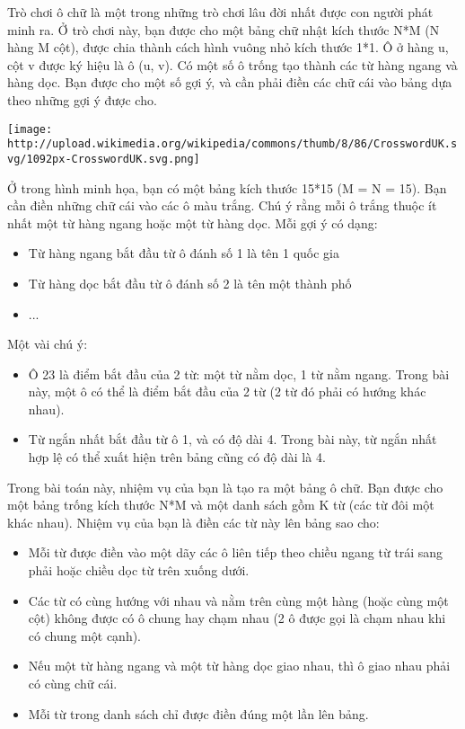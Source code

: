 

Trò chơi ô chữ là một trong những trò chơi lâu đời nhất được con người phát minh ra. Ở trò chơi này, bạn được cho một bảng chữ nhật kích thước N*M (N hàng M cột), được chia thành cách hình vuông nhỏ kích thước 1*1. Ô ở hàng u, cột v được ký hiệu là ô (u, v). Có một số ô trống tạo thành các từ hàng ngang và hàng dọc. Bạn được cho một số gợi ý, và cần phải điền các chữ cái vào bảng dựa theo những gợi ý được cho.


\texttt{[image: http://upload.wikimedia.org/wikipedia/commons/thumb/8/86/CrosswordUK.svg/1092px-CrosswordUK.svg.png]}

Ở trong hình minh họa, bạn có một bảng kích thước 15*15 (M = N = 15). Bạn cần điền những chữ cái vào các ô màu trắng. Chú ý rằng mỗi ô trắng thuộc ít nhất một từ hàng ngang hoặc một từ hàng dọc. Mỗi gợi ý có dạng:
\begin{itemize}
	\item Từ hàng ngang bắt đầu từ ô đánh số 1 là tên 1 quốc gia
	\item Từ hàng dọc bắt đầu từ ô đánh số 2 là tên một thành phố
	\item ...
\end{itemize}

Một vài chú ý:
\begin{itemize}
	\item Ô 23 là điểm bắt đầu của 2 từ: một từ nằm dọc, 1 từ nằm ngang. Trong bài này, một ô có thể là điểm bắt đầu của 2 từ (2 từ đó phải có hướng khác nhau).
	\item Từ ngắn nhất bắt đầu từ ô 1, và có độ dài 4. Trong bài này, từ ngắn nhất hợp lệ có thể xuất hiện trên bảng cũng có độ dài là 4.
\end{itemize}

Trong bài toán này, nhiệm vụ của bạn là tạo ra một bảng ô chữ. Bạn được cho một bảng trống kích thước N*M và một danh sách gồm K từ (các từ đôi một khác nhau). Nhiệm vụ của bạn là điền các từ này lên bảng sao cho:
\begin{itemize}
	\item Mỗi từ được điền vào một dãy các ô liên tiếp theo chiều ngang từ trái sang phải hoặc chiều dọc từ trên xuống dưới.
	\item Các từ có cùng hướng với nhau và nằm trên cùng một hàng (hoặc cùng một cột) không được có ô chung hay chạm nhau (2 ô được gọi là chạm nhau khi có chung một cạnh).
	\item Nếu một từ hàng ngang và một từ hàng dọc giao nhau, thì ô giao nhau phải có cùng chữ cái.
	\item Mỗi từ trong danh sách chỉ được điền đúng một lần lên bảng.
\end{itemize}

